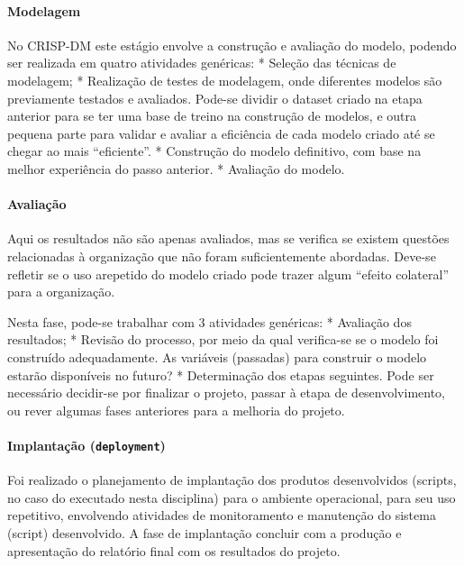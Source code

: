 \documentclass[]{article}
\let\oldparagraph\paragraph
\renewcommand{\paragraph}[1]{\oldparagraph{#1}\mbox{}}
\begin{document}
\paragraph{Modelagem}\label{modelagem}

No CRISP-DM este estágio envolve a construção e avaliação do modelo,
podendo ser realizada em quatro atividades genéricas: * Seleção das
técnicas de modelagem; * Realização de testes de modelagem, onde
diferentes modelos são previamente testados e avaliados. Pode-se dividir
o dataset criado na etapa anterior para se ter uma base de treino na
construção de modelos, e outra pequena parte para validar e avaliar a
eficiência de cada modelo criado até se chegar ao mais ``eficiente''. *
Construção do modelo definitivo, com base na melhor experiência do passo
anterior. * Avaliação do modelo.

\paragraph{Avaliação}\label{avaliacao}

Aqui os resultados não são apenas avaliados, mas se verifica se existem
questões relacionadas à organização que não foram suficientemente
abordadas. Deve-se refletir se o uso arepetido do modelo criado pode
trazer algum ``efeito colateral'' para a organização.

Nesta fase, pode-se trabalhar com 3 atividades genéricas: * Avaliação
dos resultados; * Revisão do processo, por meio da qual verifica-se se o
modelo foi construído adequadamente. As variáveis (passadas) para
construir o modelo estarão disponíveis no futuro? * Determinação dos
etapas seguintes. Pode ser necessário decidir-se por finalizar o
projeto, passar à etapa de desenvolvimento, ou rever algumas fases
anteriores para a melhoria do projeto.

\paragraph{\texorpdfstring{Implantação
(\texttt{deployment})}{Implantação (deployment)}}\label{implantacao-deployment}

Foi realizado o planejamento de implantação dos produtos desenvolvidos
(scripts, no caso do executado nesta disciplina) para o ambiente
operacional, para seu uso repetitivo, envolvendo atividades de
monitoramento e manutenção do sistema (script) desenvolvido. A fase de
implantação concluir com a produção e apresentação do relatório final
com os resultados do projeto.
\end{document}
